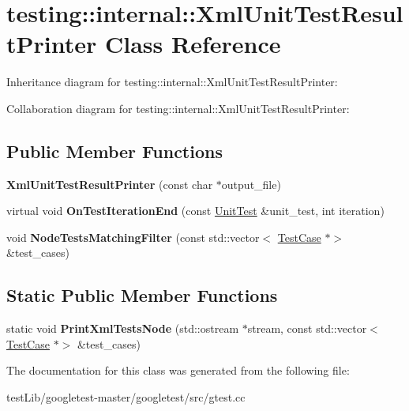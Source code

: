 \hypertarget{classtesting_1_1internal_1_1XmlUnitTestResultPrinter}{}\section{testing\+:\+:internal\+:\+:Xml\+Unit\+Test\+Result\+Printer Class Reference}
\label{classtesting_1_1internal_1_1XmlUnitTestResultPrinter}


Inheritance diagram for testing\+:\+:internal\+:\+:Xml\+Unit\+Test\+Result\+Printer\+:


Collaboration diagram for testing\+:\+:internal\+:\+:Xml\+Unit\+Test\+Result\+Printer\+:
\subsection*{Public Member Functions}
\begin{DoxyCompactItemize}
\item 
\mbox{\label{classtesting_1_1internal_1_1XmlUnitTestResultPrinter_afdaf88e6764c18ce0dcc3733d7a06e31}} 
{\bfseries Xml\+Unit\+Test\+Result\+Printer} (const char $\ast$output\+\_\+file)
\item 
\mbox{\label{classtesting_1_1internal_1_1XmlUnitTestResultPrinter_a2ae986dd2f4f2aed31cc6f3bc8c56898}} 
virtual void {\bfseries On\+Test\+Iteration\+End} (const \hyperlink{classtesting_1_1UnitTest}{Unit\+Test} \&unit\+\_\+test, int iteration)
\item 
\mbox{\label{classtesting_1_1internal_1_1XmlUnitTestResultPrinter_a0f0e0bd707d7aed5c008346d7fa95125}} 
void {\bfseries Node\+Tests\+Matching\+Filter} (const std\+::vector$<$ \hyperlink{classtesting_1_1TestCase}{Test\+Case} $\ast$$>$ \&test\+\_\+cases)
\end{DoxyCompactItemize}
\subsection*{Static Public Member Functions}
\begin{DoxyCompactItemize}
\item 
\mbox{\label{classtesting_1_1internal_1_1XmlUnitTestResultPrinter_ad202babf81b4b6d6d2f98df1e27a2d50}} 
static void {\bfseries Print\+Xml\+Tests\+Node} (std\+::ostream $\ast$stream, const std\+::vector$<$ \hyperlink{classtesting_1_1TestCase}{Test\+Case} $\ast$$>$ \&test\+\_\+cases)
\end{DoxyCompactItemize}


The documentation for this class was generated from the following file\+:\begin{DoxyCompactItemize}
\item 
test\+Lib/googletest-\/master/googletest/src/gtest.\+cc\end{DoxyCompactItemize}
